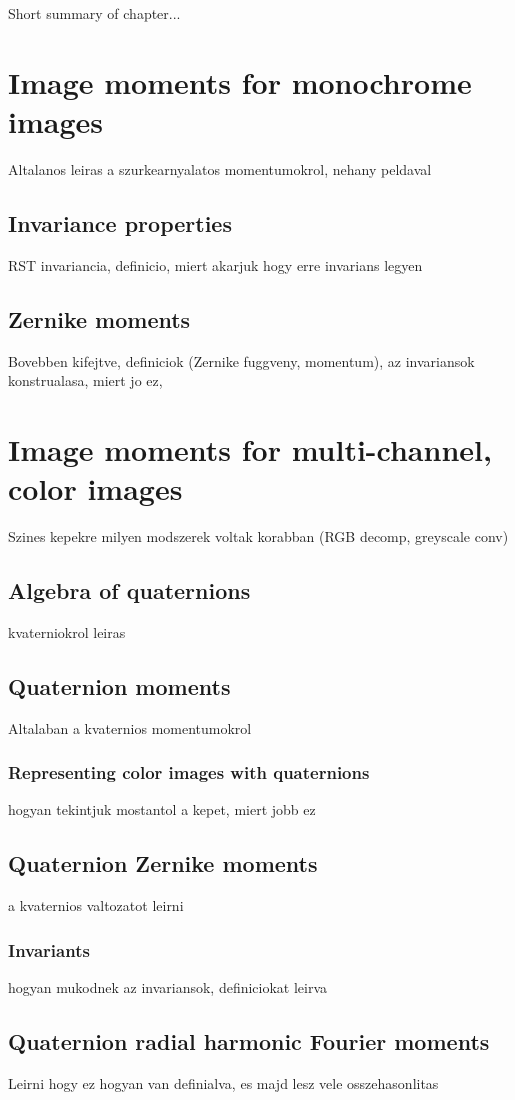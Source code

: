 Short summary of chapter...

\section{Image moments for monochrome images}
Altalanos leiras a szurkearnyalatos momentumokrol, nehany peldaval
\subsection{Invariance properties}
RST invariancia, definicio, miert akarjuk hogy erre invarians legyen
\subsection{Zernike moments}
Bovebben kifejtve, definiciok (Zernike fuggveny, momentum), az invariansok konstrualasa, miert jo ez,


\section{Image moments for multi-channel, color images}
Szines kepekre milyen modszerek voltak korabban (RGB decomp, greyscale conv)

\subsection{Algebra of quaternions}
kvaterniokrol leiras

\subsection{Quaternion moments}
Altalaban a kvaternios momentumokrol
\subsubsection{Representing color images with quaternions}
hogyan tekintjuk mostantol a kepet, miert jobb ez

\subsection{Quaternion Zernike moments}
a kvaternios valtozatot leirni
\subsubsection{Invariants}
hogyan mukodnek az invariansok, definiciokat leirva

\subsection{Quaternion radial harmonic Fourier moments}
Leirni hogy ez hogyan van definialva, es majd lesz vele osszehasonlitas


